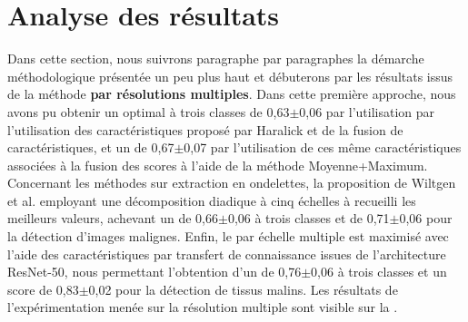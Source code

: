 \section{Analyse des résultats}
Dans cette section, nous suivrons paragraphe par paragraphes la démarche méthodologique présentée un peu plus haut et débuterons par les résultats issus de la méthode \textbf{par résolutions multiples}. Dans cette première approche, nous avons pu obtenir un \fscore{} optimal à trois classes de 0,63$\pm$0,06 par l'utilisation par l'utilisation des caractéristiques proposé par Haralick et de la fusion de caractéristiques, et un \fscore{} de 0,67$\pm$0,07 par l'utilisation de ces même caractéristiques associées à la fusion des scores à l'aide de la méthode Moyenne+Maximum. Concernant les méthodes sur extraction en ondelettes, la proposition de Wiltgen et al.\cite{Wiltgen2008} employant une décomposition diadique à cinq échelles à recueilli les meilleurs valeurs, achevant un \fscore{} de 0,66$\pm$0,06 à trois classes et de 0,71$\pm$0,06 pour la détection d'images malignes. Enfin, le \fscore{} par échelle multiple est maximisé avec l'aide des caractéristiques par transfert de connaissance issues de l'architecture ResNet-50, nous permettant l'obtention d'un \fscore{} de 0,76$\pm$0,06 à trois classes et un score de 0,83$\pm$0,02 pour la détection de tissus malins. Les résultats de l'expérimentation menée sur la résolution multiple sont visible sur la .\par

